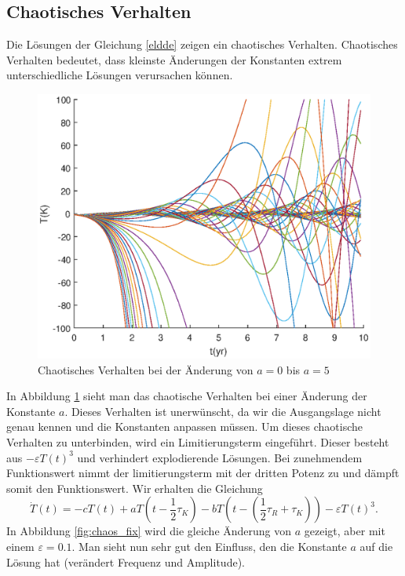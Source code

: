 \subsection{Chaotisches Verhalten}
Die Lösungen der Gleichung \eqref{eldde} zeigen ein chaotisches Verhalten.
Chaotisches Verhalten bedeutet, dass kleinste Änderungen der Konstanten extrem unterschiedliche Lösungen verursachen können. 
\begin{figure}
	\centering
	\includegraphics{verzoegert/inp/figures/param_a_e0.eps}
	\caption{Chaotisches Verhalten bei der Änderung von $a=0$ bis $a=5$}
	\label{fig:chaos}
\end{figure}
In Abbildung \ref{fig:chaos} sieht man das chaotische Verhalten bei einer Änderung der Konstante $a$.
Dieses Verhalten ist unerwünscht, da wir die Ausgangslage nicht genau kennen und die Konstanten anpassen müssen.
Um dieses chaotische Verhalten zu unterbinden, wird ein Limitierungsterm eingeführt.
Dieser besteht aus $-\varepsilon T(t)^3$ und verhindert explodierende Lösungen.
Bei zunehmendem Funktionswert nimmt der limitierungsterm mit der dritten Potenz zu und dämpft somit den Funktionswert.
Wir erhalten die Gleichung
\begin{equation} \label{eldde_epsilon}
\dot{T}(t)=-cT(t)+aT(t-\frac{1}{2}\tau_K)-bT(t-(\frac{1}{2}\tau_R+\tau_K))-\varepsilon T(t)^3.
\end{equation}
In Abbildung \ref{fig:chaos_fix} wird die gleiche Änderung von $a$ gezeigt, aber mit einem $\varepsilon = 0.1$.
Man sieht nun sehr gut den Einfluss, den die Konstante $a$ auf die Lösung hat (verändert Frequenz und Amplitude).
